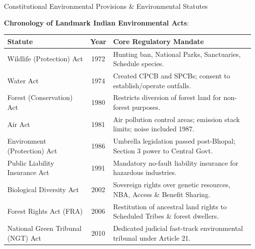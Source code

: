 \begin{lawbox}{Constitutional Environmental Provisions \& Environmental Statutes}
    \item \textbf{Chronology of Landmark Indian Environmental Acts}:
    \begin{center}
    \begin{tabularx}{\linewidth}{l c X}
    \toprule
    \textbf{Statute} & \textbf{Year} & \textbf{Core Regulatory Mandate} \\
    \midrule
    Wildlife (Protection) Act & 1972 & Hunting ban, National Parks, Sanctuaries, Schedule species. \\
    Water Act & 1974 & Created CPCB and SPCBs; consent to establish/operate outfalls. \\
    Forest (Conservation) Act & 1980 & Restricts diversion of forest land for non-forest purposes. \\
    Air Act & 1981 & Air pollution control areas; emission stack limits; noise included 1987. \\
    Environment (Protection) Act & 1986 & Umbrella legislation passed post-Bhopal; Section 3 power to Central Govt. \\
    Public Liability Insurance Act & 1991 & Mandatory no-fault liability insurance for hazardous industries. \\
    Biological Diversity Act & 2002 & Sovereign rights over genetic resources, NBA, Access \& Benefit Sharing. \\
    Forest Rights Act (FRA) & 2006 & Restitution of ancestral land rights to Scheduled Tribes \& forest dwellers. \\
    National Green Tribunal (NGT) Act & 2010 & Dedicated judicial fast-track environmental tribunal under Article 21. \\
    \bottomrule
    \end{tabularx}
    \end{center}
\end{lawbox}

